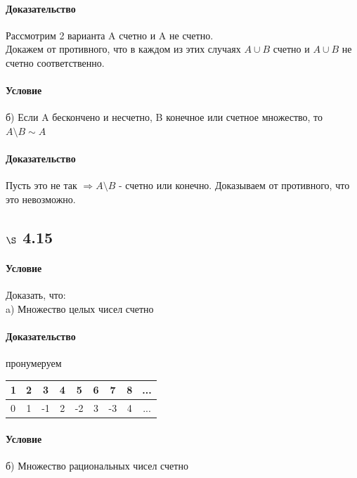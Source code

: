 \documentclass[a4paper,12pt]{article}
\begin{document}
\paragraph*{Доказательство}
Рассмотрим 2 варианта A счетно и A не счетно.\\
Докажем от противного, что в каждом из этих случаях $A \cup B$ счетно и $A \cup B$  не счетно соответственно.
\paragraph*{Условие}
б) Если A бескончено и несчетно, B конечное или счетное множество, то $ A \setminus B \sim A$
\paragraph*{Доказательство}
Пусть это не так $\Rightarrow A \setminus B$ - счетно или конечно. Доказываем от противного, что это невозможно.

\subsection*{$\S$ 4.15}
\paragraph*{Условие}
Доказать, что:\\
a) Множество целых чисел счетно
\paragraph*{Доказательство}
пронумеруем
\begin{center}
  \begin{tabular}{ | l | c | c| c| c| c| c| c| c }
    \hline
    1 & 2 & 3  & 4 & 5  & 6 & 7  & 8 & ...\\ \hline
    0 & 1 & -1 & 2 & -2 & 3 & -3 & 4 & ...\\ \hline
  \end{tabular}
\end{center}
\paragraph*{Условие}
б) Множество рациональных чисел счетно
\end{document}
